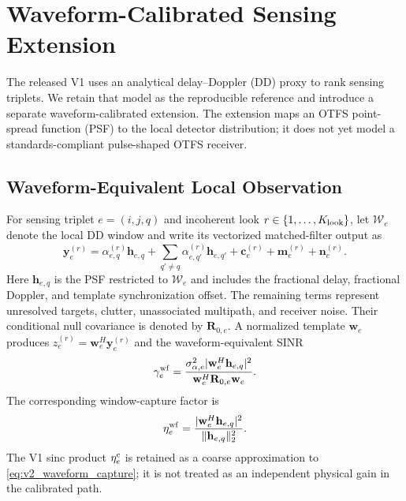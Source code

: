\section{Waveform-Calibrated Sensing Extension}
\label{sec:waveform_calibrated_extension}

The released V1 uses an analytical delay--Doppler (DD) proxy to rank sensing
triplets.  We retain that model as the reproducible reference and introduce a
separate waveform-calibrated extension.  The extension maps an OTFS point-spread
function (PSF) to the local detector distribution; it does not yet model a
standards-compliant pulse-shaped OTFS receiver.

\subsection{Waveform-Equivalent Local Observation}

For sensing triplet $e=(i,j,q)$ and incoherent look
$r\in\{1,\ldots,K_{\rm look}\}$, let $\mathcal W_e$ denote the local DD
window and write its vectorized matched-filter output as
\begin{equation}
 \mathbf y_e^{(r)}=
 \alpha_{e,q}^{(r)}\mathbf h_{e,q}
 +\sum_{q'\ne q}\alpha_{e,q'}^{(r)}\mathbf h_{e,q'}
 +\mathbf c_e^{(r)}+\mathbf m_e^{(r)}+\mathbf n_e^{(r)}.
 \label{eq:v2_waveform_observation}
\end{equation}
Here $\mathbf h_{e,q}$ is the PSF restricted to $\mathcal W_e$ and includes
the fractional delay, fractional Doppler, and template synchronization offset.
The remaining terms represent unresolved targets, clutter, unassociated
multipath, and receiver noise.  Their conditional null covariance is denoted by
$\mathbf R_{0,e}$.  A normalized template $\mathbf w_e$ produces
$z_e^{(r)}=\mathbf w_e^{H}\mathbf y_e^{(r)}$ and the waveform-equivalent SINR
\begin{equation}
 \gamma_e^{\rm wf}=
 \frac{\sigma_{\alpha,e}^{2}
       |\mathbf w_e^{H}\mathbf h_{e,q}|^2}
      {\mathbf w_e^{H}\mathbf R_{0,e}\mathbf w_e}.
 \label{eq:v2_waveform_sinr}
\end{equation}
The corresponding window-capture factor is
\begin{equation}
 \eta_e^{\rm wf}=
 \frac{|\mathbf w_e^{H}\mathbf h_{e,q}|^2}
      {\|\mathbf h_{e,q}\|_2^2}.
 \label{eq:v2_waveform_capture}
\end{equation}
The V1 sinc product $\eta_e^{\rm c}$ is retained as a coarse approximation to
\eqref{eq:v2_waveform_capture}; it is not treated as an independent physical
gain in the calibrated path.

